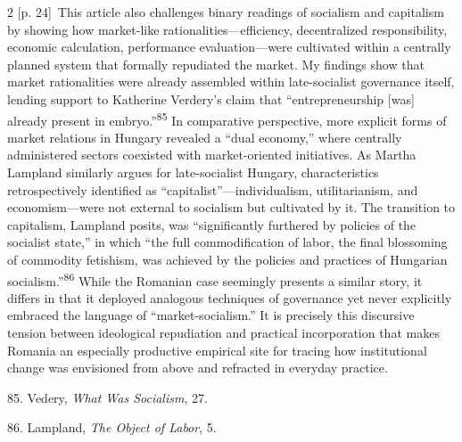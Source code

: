 \documentclass[10pt,a4paper]{article}
\begin{document}
\begin{paracol}{2}
\switchcolumn
{\scriptsize\color{gray} [p. 24]}\ This article also challenges binary readings of socialism and capitalism by showing how market-like rationalities—efficiency, decentralized responsibility, economic calculation, performance evaluation—were cultivated within a centrally planned system that formally repudiated the market. My findings show that market rationalities were already assembled within late-socialist governance itself, lending support to Katherine Verdery’s claim that “entrepreneurship [was] already present in embryo.”\nobreak\textsuperscript{85} In comparative perspective, more explicit forms of market relations in Hungary revealed a “dual economy,” where centrally administered sectors coexisted with market-oriented initiatives. As Martha Lampland similarly argues for late-socialist Hungary, characteristics retrospectively identified as “capitalist”—individualism, utilitarianism, and economism—were not external to socialism but cultivated by it. The transition to capitalism, Lampland posits, was “significantly furthered by policies of the socialist state,” in which “the full commodification of labor, the final blossoming of commodity fetishism, was achieved by the policies and practices of Hungarian socialism.”\nobreak\textsuperscript{86} While the Romanian case seemingly presents a similar story, it differs in that it deployed analogous techniques of governance yet never explicitly embraced the language of “market-socialism.” It is precisely this discursive tension between ideological repudiation and practical incorporation that makes Romania an especially productive empirical site for tracing how institutional change was envisioned from above and refracted in everyday practice.\par{\small 85. Vedery, \textit{What Was Socialism}, 27.\par}{\small 86. Lampland, \textit{The Object of Labor}, 5.\par}
\switchcolumn*

\end{paracol}
\end{document}
